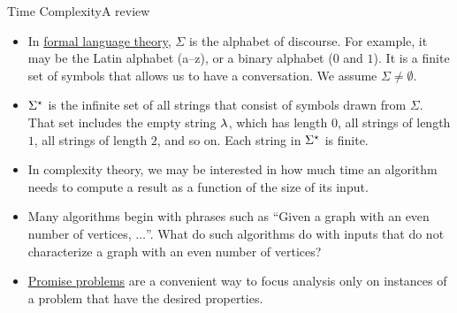 \begin{frame}{Time Complexity}{A review}
\begin{itemize}[<+->]
    \item In \href{https://en.wikipedia.org/wiki/Formal_language}{formal language theory}, $\Sigma$ is the alphabet of discourse. For example, it may be the Latin alphabet (a--z), or a binary alphabet ($0$ and $1$).  It is a finite set of symbols that allows us to have a conversation.  We assume $\Sigma\not=\emptyset$.
    \item $\Sigma^{\star}$ is the infinite set of all strings that consist of symbols drawn from $\Sigma$.  That set includes the empty string $\lambda$, which has length $0$, all strings of length $1$, all strings of length $2$, and so on.  Each string in $\Sigma^{\star}$ is finite.
    \item In complexity theory, we may be interested in how much time an algorithm needs to compute a result as a function of the size of its input.
    \item Many algorithms begin with phrases such as ``Given a graph with an even number of vertices, $\ldots$''.  What do such algorithms do with inputs that do not characterize a graph with an even number of vertices?
    \item \href{https://en.wikipedia.org/wiki/Promise_problem}{Promise problems} are a convenient way to focus analysis only on instances of a problem that have the desired properties.
\end{itemize}

\end{frame}
